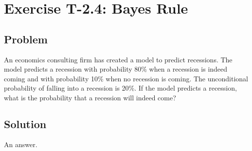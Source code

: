\section*{Exercise T-2.4: Bayes Rule}

\subsection*{Problem}

An economics consulting firm has created a model to predict recessions. The model predicts a recession with probability 80\% when a recession is indeed coming and with probability 10\% when no recession is coming. The unconditional probability of falling into a recession is 20\%. If the model predicts a recession, what is the probability that a recession will indeed come?

\subsection*{Solution}
An answer.

